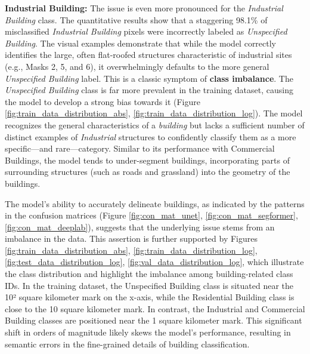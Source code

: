 \documentclass{report}
\begin{document}
\textbf{Industrial Building:} The issue is even more pronounced for the \textit{Industrial Building} class. The quantitative results show that a staggering 98.1\% of misclassified  \textit{Industrial Building}  pixels were incorrectly labeled as \textit{Unspecified Building}. The visual examples demonstrate that while the model correctly identifies the large, often flat-roofed structures characteristic of industrial sites (e.g., Masks 2, 5, and 6), it overwhelmingly defaults to the more general \textit{Unspecified Building }label. This is a classic symptom of \textbf{class imbalance}. The \textit{Unspecified Building} class is far more prevalent in the training dataset, causing the model to develop a strong bias towards it (Figure \ref{fig:train_data_distribution_abs}, \ref{fig:train_data_distribution_log}). The model recognizes the general characteristics of a \textit{building} but lacks a sufficient number of distinct examples of  \textit{Industrial}  structures to confidently classify them as a more specific—and rare—category. Similar to its performance with Commercial Buildings, the model tends to under-segment buildings, incorporating parts of surrounding structures (such as roads and grassland) into the geometry of the buildings. \par
The model's ability to accurately delineate buildings, as indicated by the patterns in the confusion matrices (Figure \ref{fig:con_mat_unet}, \ref{fig:con_mat_segformer}, \ref{fig:con_mat_deeplab}), suggests that the underlying issue stems from an imbalance in the data. This assertion is further supported by Figures \ref{fig:train_data_distribution_abs}, \ref{fig:train_data_distribution_log}, \ref{fig:test_data_distribution_log}, \ref{fig:val_data_distribution_log}, which illustrate the class distribution and highlight the imbalance among building-related class IDs. In the training dataset, the Unspecified Building class is situated near the 10² square kilometer mark on the x-axis, while the Residential Building class is close to the 10 square kilometer mark. In contrast, the Industrial and Commercial Building classes are positioned near the 1 square kilometer mark. This significant shift in orders of magnitude likely skews the model's performance, resulting in semantic errors in the fine-grained details of building classification.
\end{document}
